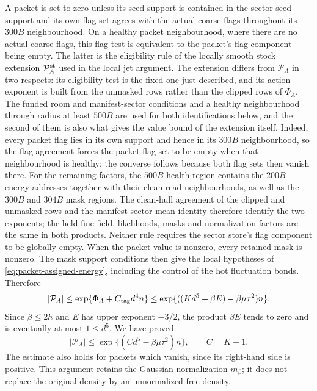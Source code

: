 A packet is set to zero unless its seed support is contained in the
sector seed support and its own flag set agrees with the actual coarse
flags throughout its $300B$ neighbourhood. On a healthy packet
neighbourhood, where there are no actual coarse flags, this flag test is
equivalent to the packet's flag component being empty. The latter is
the eligibility rule of the locally smooth stock extension
$\mathcal P_A^{\rm st}$ used in the local jet argument. The extension
differs from $\mathcal P_A$ in two respects: its eligibility test is
the fixed one just described, and its action exponent is built from
the unmasked rows rather than the clipped rows of $\Phi_A$. The
funded room and manifest-sector conditions and a healthy neighbourhood
through radius at least $500B$ are used for both identifications below,
and the second of them is also what gives the value bound of the
extension itself. Indeed, every packet flag lies in its
own support and hence in its $300B$ neighbourhood, so the flag
agreement forces the packet flag set to be empty when that neighbourhood
is healthy; the converse follows because both flag sets then vanish
there. For the remaining factors, the $500B$ health region contains the
$200B$ energy addresses together with their clean read neighbourhoods,
as well as the $300B$ and $304B$ mask regions. The clean-hull agreement
of the clipped and unmasked rows and the manifest-sector mean identity
therefore identify the two exponents; the held fine field, likelihoods,
masks and normalization factors are the same in both products.
Neither rule requires the sector
store's flag component to be globally empty. When the packet value is
nonzero, every retained mask is nonzero. The mask
support conditions then give the local hypotheses of
\eqref{eq:packet-assigned-energy}, including the control of the hot
fluctuation bonds. Therefore
\[
 |\mathcal P_A|
 \le\exp\{\Phi_A+C_{\rm tag}d^4n\}
 \le\exp\{((K d^5+\beta E)-\beta\mu\tau^2)n\}.
\]
Since $\beta\le2h$ and $E$ has upper exponent $-3/2$, the product
$\beta E$ tends to zero and is eventually at most $1\le d^5$.
We have proved
\begin{equation}\label{eq:packet-value-price}
 |\mathcal P_A|\le
 \exp\{(C d^5-\beta\mu\tau^2)n\},\qquad C=K+1.
\end{equation}
The estimate also holds for packets which vanish, since its right-hand
side is positive. This argument retains the Gaussian normalization
$m_\beta$; it does not replace the original density by an unnormalized
free density.

